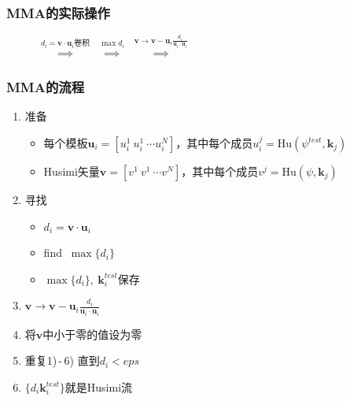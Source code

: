 \documentclass[UTF8]{beamer}
\begin{document}
\begin{frame}[allowframebreaks]
	\frametitle{MMA的实际操作}
	\begin{figure}
		\centering
		$\stackrel{d_i=\mathbf{v}\cdot\mathbf{u}_i\text{卷积}}{\implies}$
		$\stackrel{\max d_i}{\implies}$
		$\stackrel{\mathbf{v}\rightarrow\mathbf{v}-\mathbf{u}_{i}\frac{d_{i}}{\mathbf{u}_{i}\cdot\mathbf{u}_{i}}}{\implies}$
	\end{figure}
\end{frame}

\begin{frame}[allowframebreaks]
	\frametitle{\textbf{MMA}的流程}
	\begin{enumerate}
		\item 准备
		      \begin{itemize}
			      \item 每个模板$\mathbf{u}_i=[u_i^1\ u_i^1\ \cdots u_i^N]$，其中每个成员$u_i^j=\mathrm{Hu}(\psi^{test},\mathbf{k}_j)$
			      \item Husimi矢量$\mathbf{v}=[v^1\ v^1\ \cdots v^N]$，其中每个成员$v^j=\mathrm{Hu}(\psi,\mathbf{k}_j)$
		      \end{itemize}
		\item 寻找
		      \begin{itemize}
			      \item $d_i = \mathbf{v}\cdot\mathbf{u}_i$
			      \item find $\ \max \{d_i\}$
			      \item $\max\{d_i\},\ \mathbf{k}_i^{test}$保存
		      \end{itemize}
		\item $\mathbf{v}\rightarrow\mathbf{v}-\mathbf{u}_i\frac{d_i}{\mathbf{u}_i\cdot\mathbf{u}_i}$
		\item 将$\mathbf{v}$中小于零的值设为零
		\item 重复1)\,-\,6) 直到$d_i<eps$
		\item $\{d_i\mathbf{k}_i^{test}\}$就是Husimi流
	\end{enumerate}
\end{frame}

%
\end{document}

